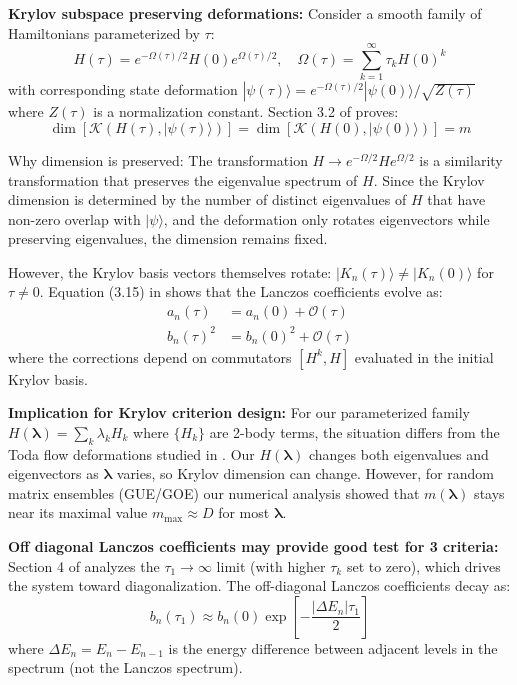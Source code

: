 \documentclass[ a4paper, 
                amsfonts, 
                amssymb, 
                amsmath, 
                reprint, 
                showkeys, 
                nofootinbib,
                superscriptaddress, 
                onecolumn, 
                notitlepage,
                aps,
                pra,
                longbibliography]{revtex4-1}
\theoremstyle{definition}
\begin{document}
\textbf{Krylov subspace preserving deformations:} Consider a smooth family of Hamiltonians parameterized by $\tau$:
\begin{equation}
H(\tau) = e^{-\Omega(\tau)/2} H(0) e^{\Omega(\tau)/2}, \quad \Omega(\tau) = \sum_{k=1}^\infty \tau_k H(0)^k
\end{equation}
with corresponding state deformation $|\psi(\tau)\rangle = e^{-\Omega(\tau)/2}|\psi(0)\rangle/\sqrt{Z(\tau)}$ where $Z(\tau)$ is a normalization constant. Section 3.2 of \cite{takahashi2025krylovcomplexityhamiltoniandeformations} proves:
\begin{equation}
\dim[\mathcal{K}(H(\tau), |\psi(\tau)\rangle)] = \dim[\mathcal{K}(H(0), |\psi(0)\rangle)] = m
\end{equation}

Why dimension is preserved: The transformation $H \to e^{-\Omega/2} H e^{\Omega/2}$ is a similarity transformation that preserves the eigenvalue spectrum of $H$. Since the Krylov dimension is determined by the number of distinct eigenvalues of $H$ that have non-zero overlap with $|\psi\rangle$, and the deformation only rotates eigenvectors while preserving eigenvalues, the dimension remains fixed.

However, the Krylov basis vectors themselves rotate: $|K_n(\tau)\rangle \neq |K_n(0)\rangle$ for $\tau \neq 0$. Equation (3.15) in \cite{takahashi2025krylovcomplexityhamiltoniandeformations} shows that the Lanczos coefficients evolve as:
\begin{align}
a_n(\tau) &= a_n(0) + \mathcal{O}(\tau) \\
b_n(\tau)^2 &= b_n(0)^2 + \mathcal{O}(\tau)
\end{align}
where the corrections depend on commutators $[H^k, H]$ evaluated in the initial Krylov basis.

\textbf{Implication for Krylov criterion design:} For our parameterized family $H(\boldsymbol{\lambda}) = \sum_k \lambda_k H_k$ where $\{H_k\}$ are 2-body terms, the situation differs from the Toda flow deformations studied in \cite{takahashi2025krylovcomplexityhamiltoniandeformations}. Our $H(\boldsymbol{\lambda})$ changes both eigenvalues and eigenvectors as $\boldsymbol{\lambda}$ varies, so Krylov dimension can change. However, for random matrix ensembles (GUE/GOE) our numerical analysis showed that $m(\boldsymbol{\lambda})$ stays near its maximal value $m_{\max} \approx D$ for most $\boldsymbol{\lambda}$.

\textbf{Off diagonal Lanczos coefficients may provide good test for 3 criteria:} Section 4 of \cite{takahashi2025krylovcomplexityhamiltoniandeformations} analyzes the $\tau_1 \to \infty$ limit (with higher $\tau_k$ set to zero), which drives the system toward diagonalization. The off-diagonal Lanczos coefficients decay as:
\begin{equation}
b_n(\tau_1) \approx b_n(0) \exp\left[-\frac{|\Delta E_n| \tau_1}{2}\right]
\end{equation}
where $\Delta E_n = E_n - E_{n-1}$ is the energy difference between adjacent levels in the spectrum (not the Lanczos spectrum).
\end{document}
